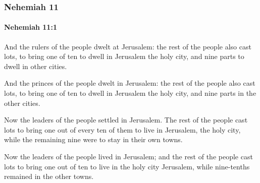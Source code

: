 	\subsubsection{Nehemiah 11} %
		\label{NEHEMIAH-11}

		\paragraph{Nehemiah 11:1} %
			\label{NEHEMIAH-11-1}

			And the rulers of the people dwelt at Jerusalem: the rest of the people also cast lots, to bring one of ten to dwell in Jerusalem the holy city, and nine parts to dwell in other cities.

			\begin{versebox}
					\item[BHS] 
					\item[LXX] 
					\item[ASV] And the princes of the people dwelt in Jerusalem: the rest of the people also cast lots, to bring one of ten to dwell in Jerusalem the holy city, and nine parts in the other cities.
					\item[NIV] Now the leaders of the people settled in Jerusalem. The rest of the people cast lots to bring one out of every ten of them to live in Jerusalem, the holy city, while the remaining nine were to stay in their own towns.
					\item[NRSV] Now the leaders of the people lived in Jerusalem; and the rest of the people cast lots to bring one out of ten to live in the holy city Jerusalem, while nine-tenths remained in the other towns.
			\end{versebox}

